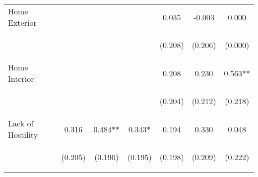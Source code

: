 \begin{tabular}{lcccccc}
\noalign{\smallskip}Home Exterior &  &  &  & 0.035 & -0.003 & 0.000\\
 & \begin{footnotesize}\end{footnotesize} & \begin{footnotesize}\end{footnotesize} & \begin{footnotesize}\end{footnotesize} & \begin{footnotesize}(0.208)\end{footnotesize} & \begin{footnotesize}(0.206)\end{footnotesize} & \begin{footnotesize}(0.000)\end{footnotesize}\\
\noalign{\smallskip}Home Interior &  &  &  & 0.208 & 0.230 & 0.563**\\
 & \begin{footnotesize}\end{footnotesize} & \begin{footnotesize}\end{footnotesize} & \begin{footnotesize}\end{footnotesize} & \begin{footnotesize}(0.204)\end{footnotesize} & \begin{footnotesize}(0.212)\end{footnotesize} & \begin{footnotesize}(0.218)\end{footnotesize}\\
\noalign{\smallskip}Lack of Hostility & 0.316 & 0.484** & 0.343* & 0.194 & 0.330 & 0.048\\
 & \begin{footnotesize}(0.205)\end{footnotesize} & \begin{footnotesize}(0.190)\end{footnotesize} & \begin{footnotesize}(0.195)\end{footnotesize} & \begin{footnotesize}(0.198)\end{footnotesize} & \begin{footnotesize}(0.209)\end{footnotesize} & \begin{footnotesize}(0.222)\end{footnotesize}\\

\end{tabular}
